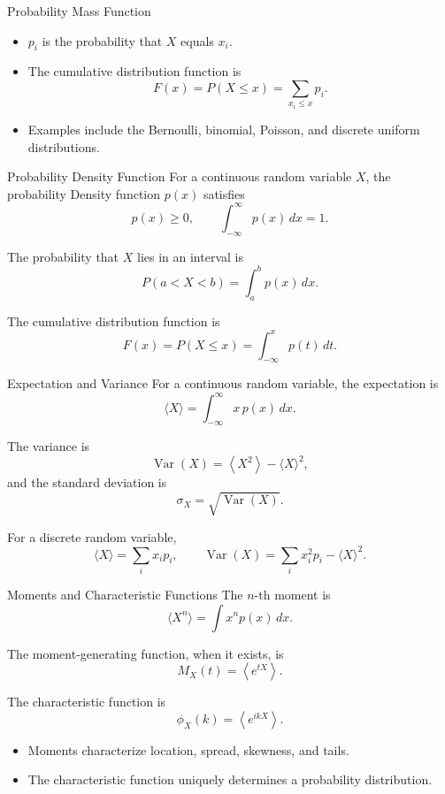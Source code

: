 \documentclass[a4paper, 10pt, onepage]{elegantbook}
\begin{document}
{\begin{frame}{Probability Mass Function}
  \begin{itemize}
    \item \(p_i\) is the probability that \(X\) equals \(x_i\).
    \item The cumulative distribution function is
    \[
      F(x)=P(X\le x)=\sum_{x_i\le x}p_i.
    \]
    \item Examples include the Bernoulli, binomial, Poisson, and discrete uniform distributions.
  \end{itemize}
\end{frame}

\begin{frame}{Probability Density Function}
  For a continuous random variable \(X\), the probability Density function \(p(x)\) satisfies
  \[
    p(x)\ge 0,
    \qquad
    \int_{-\infty}^{\infty}p(x)\,dx=1.
  \]

  The probability that \(X\) lies in an interval is
  \[
    P(a<X<b)=\int_a^b p(x)\,dx.
  \]

  The cumulative distribution function is
  \[
    F(x)=P(X\le x)=\int_{-\infty}^{x}p(t)\,dt.
  \]
\end{frame}

\begin{frame}{Expectation and Variance}
  For a continuous random variable, the expectation is
  \[
    \langle X\rangle
    =
    \int_{-\infty}^{\infty}x\,p(x)\,dx.
  \]

  The variance is
  \[
    \operatorname{Var}(X)
    =
    \left\langle X^2\right\rangle
    -
    \langle X\rangle^2,
  \]
  and the standard deviation is
  \[
    \sigma_X=\sqrt{\operatorname{Var}(X)}.
  \]

  For a discrete random variable,
  \[
    \langle X\rangle=\sum_i x_ip_i,
    \qquad
    \operatorname{Var}(X)=\sum_i x_i^2p_i-\langle X\rangle^2.
  \]
\end{frame}

\begin{frame}{Moments and Characteristic Functions}
  The \(n\)-th moment is
  \[
    \langle X^n\rangle
    =
    \int x^n p(x)\,dx.
  \]

  The moment-generating function, when it exists, is
  \[
    M_X(t)=\left\langle e^{tX}\right\rangle.
  \]

  The characteristic function is
  \[
    \phi_X(k)=\left\langle e^{ikX}\right\rangle.
  \]

  \begin{itemize}
    \item Moments characterize location, spread, skewness, and tails.
    \item The characteristic function uniquely determines a probability distribution.
  \end{itemize}
\end{frame}

}
\end{document}
